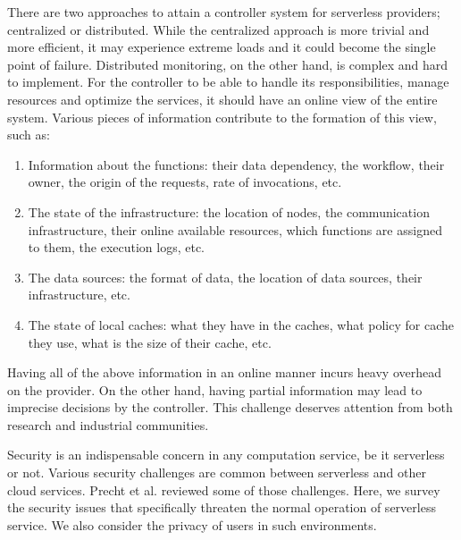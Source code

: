 There are two approaches to attain a controller system for serverless providers; centralized or distributed. While the centralized approach is more trivial and more efficient, it may experience extreme loads and it could become the single point of failure. Distributed monitoring, on the other hand, is complex and hard to implement.
For the controller to be able to handle its responsibilities, manage resources and optimize the services, it should have an online view of the entire system. Various pieces of information contribute to the formation of this view, such as:
\begin{enumerate}
\item Information about the functions: their data dependency, the workflow, their owner, the origin of the requests, rate of invocations, etc.
\item The state of the infrastructure: the location of nodes, the communication infrastructure, their online available resources, which functions are assigned to them, the execution logs, etc.
\item The data sources: the format of data, the location of data sources, their infrastructure, etc. 
\item The state of local caches: what they have in the caches, what policy for cache they use, what is the size of their cache, etc.
\end{enumerate}
Having all of the above information in an online manner incurs heavy overhead on the provider. On the other hand, having partial information may lead to imprecise decisions by the controller. This challenge deserves attention from both research and industrial communities.

Security is an indispensable concern in any computation service, be it serverless or not. Various security challenges are common between serverless and other cloud services. Precht et al.  reviewed some of those challenges. Here, we survey the security issues that specifically threaten the normal operation of serverless service. We also consider the privacy of users in such environments.

